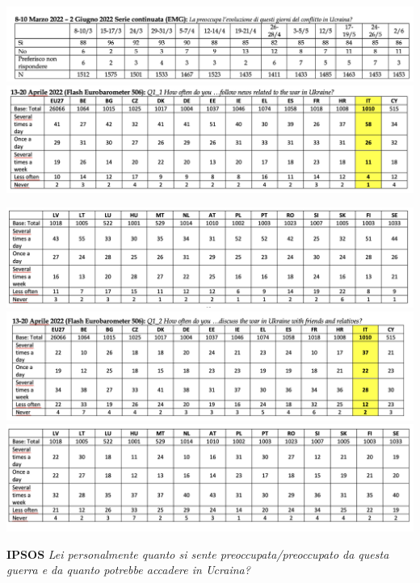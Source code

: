 \documentclass[
]{book}
\begin{document}
\includegraphics{images/0023.png}
\includegraphics{images/0024.png}

\includegraphics{images/0025.png}
\includegraphics{images/0026.png}
\includegraphics{images/0027.png}

\textbf{IPSOS} \emph{Lei personalmente quanto si sente preoccupata/preoccupato da questa guerra e da quanto potrebbe accadere in Ucraina?}
\end{document}
